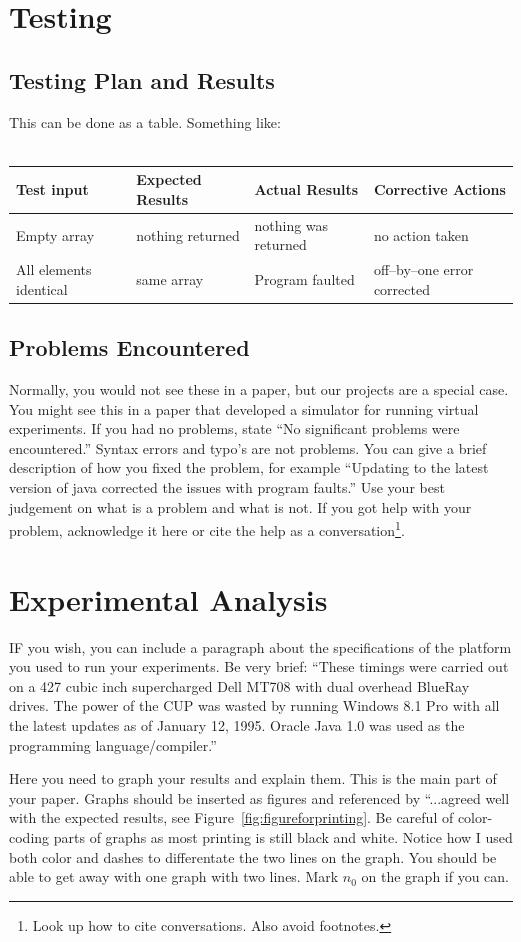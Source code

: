 \documentclass[onecolumn, 12pt, article]{IEEEtran}
\numberwithin{case}{problem}
\numberwithin{condition}{problem}
\numberwithin{condition}{subsection}
\numberwithin{definition}{section}
\theoremstyle{remark}
\numberwithin{question}{problem}
\theoremstyle{plain}
\numberwithin{answer}{problem}
\numberwithin{solution}{section}
\numberwithin{equation}{section}%
\begin{document}
\section{Testing}
\subsection{Testing Plan and Results}
This can be done as a table.  Something like:\\\\
\small{\begin{tabular}{|l|l|l|l|}
\hline Test input & Expected Results & Actual Results & Corrective Actions \\ 
\hline  Empty array & nothing returned  & nothing was returned & no action taken  \\ 
\hline All elements identical & same array  & Program faulted & off--by--one error corrected  \\ 
\hline 
\end{tabular}}
\subsection{Problems Encountered}
Normally, you would not see these in a paper, but our projects are a special case.  You might see this in a paper that developed a simulator for running virtual experiments.  If you had no problems, state ``No significant problems were encountered.''  Syntax errors and typo's are not problems.  You can give a brief description of how you fixed the problem, for example ``Updating to the latest version of java corrected the issues with program faults.''  Use your best judgement on what is a problem and what is not.   If you got help with your problem, acknowledge it here or cite the help as a conversation\footnote{Look up how to cite conversations.  Also avoid footnotes.}.

\section{Experimental Analysis}
IF you wish, you can include a paragraph about the specifications of the platform you used to run your experiments.  Be very brief:  ``These timings were carried out on a 427 cubic inch supercharged Dell MT708 with dual overhead BlueRay drives.  The power of the CUP was wasted by running Windows 8.1 Pro with all the latest updates as of January 12, 1995.  Oracle Java 1.0 was used as the programming language/compiler.''  

Here you need to graph your results and explain them.  This is the main part of your paper.   Graphs should be inserted as figures and referenced by ``...agreed well with the expected results, see Figure~\ref{fig:figureforprinting}.  Be careful of color-coding parts of graphs as most printing is still black and white.  Notice how I used both color and dashes to differentate the two lines on the graph.   You should be able to get away with one graph with two lines.  Mark $n_0$ on the graph if you can.
\end{document}
